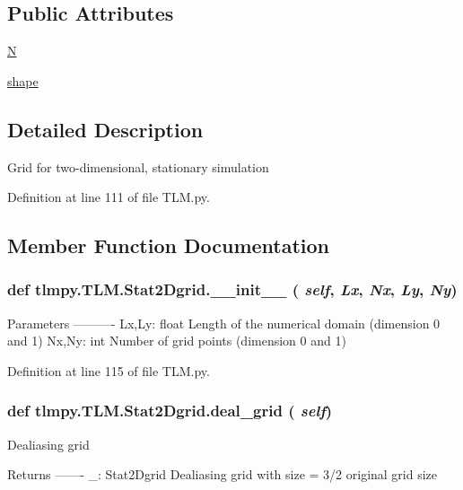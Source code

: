 \subsection*{Public Attributes}
\begin{DoxyCompactItemize}
\item 
\hyperlink{classtlmpy_1_1TLM_1_1Stat2Dgrid_a56f633498281a26a009a79d858562025}{N}
\item 
\hyperlink{classtlmpy_1_1TLM_1_1Stat2Dgrid_a8d276f22a219168f7bf3b21145d693aa}{shape}
\end{DoxyCompactItemize}


\subsection{Detailed Description}
\begin{DoxyVerb}
Grid for two-dimensional, stationary simulation
\end{DoxyVerb}
 

Definition at line 111 of file TLM.py.

\subsection{Member Function Documentation}
\hypertarget{classtlmpy_1_1TLM_1_1Stat2Dgrid_a18bdbdd10be871ca7950edd9b436b7a0}{
\subsubsection[{\_\-\_\-init\_\-\_\-}]{\setlength{\rightskip}{0pt plus 5cm}def tlmpy.TLM.Stat2Dgrid.\_\-\_\-init\_\-\_\- ( {\em self}, \/   {\em Lx}, \/   {\em Nx}, \/   {\em Ly}, \/   {\em Ny})}}
\label{classtlmpy_1_1TLM_1_1Stat2Dgrid_a18bdbdd10be871ca7950edd9b436b7a0}
\begin{DoxyVerb}
Parameters
----------
Lx,Ly: float
    Length of the numerical domain (dimension 0 and 1)
Nx,Ny: int
    Number of grid points (dimension 0 and 1)
\end{DoxyVerb}
 

Definition at line 115 of file TLM.py.\hypertarget{classtlmpy_1_1TLM_1_1Stat2Dgrid_a0e610fd041841f4617a4c783a351f4b4}{
\subsubsection[{deal\_\-grid}]{\setlength{\rightskip}{0pt plus 5cm}def tlmpy.TLM.Stat2Dgrid.deal\_\-grid ( {\em self})}}
\label{classtlmpy_1_1TLM_1_1Stat2Dgrid_a0e610fd041841f4617a4c783a351f4b4}
\begin{DoxyVerb}
Dealiasing grid

Returns
-------
_: Stat2Dgrid
    Dealiasing grid with size = 3/2 original grid size
\end{DoxyVerb}
 

